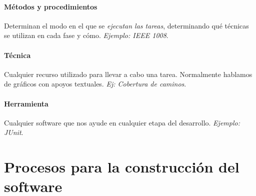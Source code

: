 \paragraph{Métodos y procedimientos} Determinan el modo en el que se \textit{ejecutan las tareas}, determinando qué técnicas se utilizan en cada fase y cómo. \textit{Ejemplo: IEEE 1008}.

\paragraph{Técnica} Cualquier recurso utilizado para llevar a cabo una tarea. Normalmente hablamos de gráficos con apoyos textuales.\textit{ Ej: Cobertura de caminos}.

\paragraph{Herramienta} Cualquier software que nos ayude en cualquier etapa del desarrollo. \textit{Ejemplo: JUnit}.



\section{Procesos para la construcción del software}




